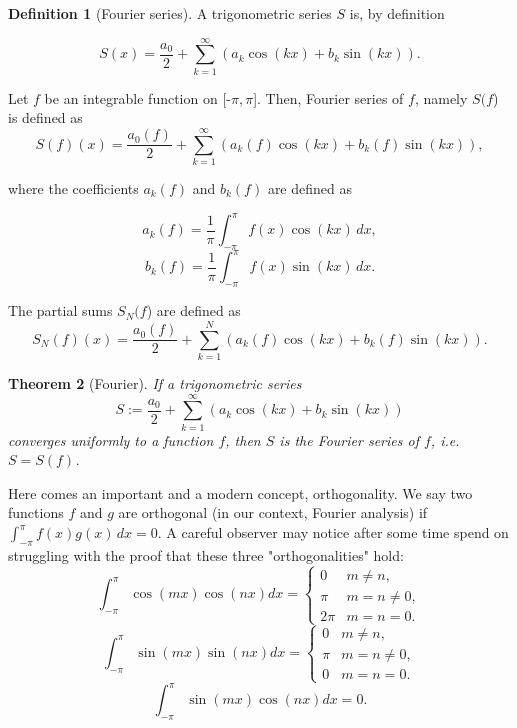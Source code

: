 \documentclass[12pt]{amsart}
\newtheorem{theorem}{Theorem}[section]
\theoremstyle{definition}
\newtheorem{definition}[theorem]{Definition}
\begin{document}
\begin{definition}[Fourier series]\footnotemark{}





    A  trigonometric series $S$ is, by definition

    \[
    S(x) = \frac{a_0}{2} +  \sum_{k = 1}^{\infty} (a_k \cos(kx) + b_k \sin(kx)).
    \]


    Let \(f\) be an integrable function on [-$\pi, \pi$]. Then, Fourier series of \(f\), namely $S($\(f\)) is defined as
    \[
    S(f)(x) = \frac{a_0(f)}{2} +  \sum_{k = 1}^{\infty} (a_k(f)  \cos(kx) + b_k(f)  \sin(kx)),
    \]


    where the coefficients $a_k(f)$ and $b_k(f)$ are defined as

    \[
    a_k(f) = \frac{1}{\pi}\int_{-\pi}^{\pi} f(x) \cos(kx)\,dx,
    \]
    \[
    b_k(f) = \frac{1}{\pi}\int_{-\pi}^{\pi} f(x) \sin(kx)\,dx.
    \]

    

    The partial sums $S_N($\(f\)) are defined as
    \[
    S_N(f)(x) = \frac{a_0(f)}{2} +  \sum_{k = 1}^{N} (a_k(f)  \cos(kx) + b_k(f)  \sin(kx)).
    \]

    
\end{definition}


\begin{theorem}[Fourier]
    If a trigonometric series
    \[
    S := \frac{a_0}{2} +  \sum_{k = 1}^{\infty} (a_k  \cos(kx) + b_k  \sin(kx))
    \]
   converges uniformly to a function \(f\), then $S$ is the Fourier series of \(f\), i.e. $S = S(f)$.
\end{theorem}

    Here comes an important and a modern concept, orthogonality\footnotemark{}. We say two functions $f$ and $g$ are orthogonal (in our context, Fourier analysis) if $\int_{-\pi}^{\pi} f(x)g(x)\,dx = 0$. A careful observer may notice after some time spend on struggling with the proof that these three "orthogonalities" hold:
    \[
    \int_{-\pi}^{\pi} \cos(mx)\cos(nx)dx = \begin{cases}
                                        0 & m \neq n, \\
                                      \pi &  m = n \neq 0,\\
                                     2\pi & m = n = 0.
                                        \end{cases}
    \]
    \[
    \int_{-\pi}^{\pi} \sin(mx)\sin(nx)dx = \begin{cases}
                                        0 & m \neq n, \\
                                      \pi &  m = n \neq 0,\\
                                        0 & m = n = 0.
                                        \end{cases}
    \]
    \[
    \int_{-\pi}^{\pi} \sin(mx)\cos(nx)dx = 0.
    \]
\end{document}
